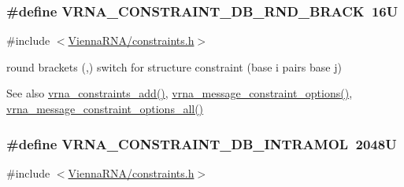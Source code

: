 \subsubsection[{V\+R\+N\+A\+\_\+\+C\+O\+N\+S\+T\+R\+A\+I\+N\+T\+\_\+\+D\+B\+\_\+\+R\+N\+D\+\_\+\+B\+R\+A\+C\+K}]{\setlength{\rightskip}{0pt plus 5cm}\#define V\+R\+N\+A\+\_\+\+C\+O\+N\+S\+T\+R\+A\+I\+N\+T\+\_\+\+D\+B\+\_\+\+R\+N\+D\+\_\+\+B\+R\+A\+C\+K~16\+U}\label{group__constraints_gac17b034852c914bc5879954c65d7e74b}


{\ttfamily \#include $<$\hyperlink{constraints_8h}{Vienna\+R\+N\+A/constraints.\+h}$>$}



round brackets \textquotesingle{}(\textquotesingle{},\textquotesingle{})\textquotesingle{} switch for structure constraint (base i pairs base j) 

\begin{DoxySeeAlso}{See also}
\hyperlink{group__constraints_ga35a401f680969a556858a8dd5f1d07cc}{vrna\+\_\+constraints\+\_\+add()}, \hyperlink{group__constraints_gaa1f20b53bf09ac2e6b0dbb13f7d89670}{vrna\+\_\+message\+\_\+constraint\+\_\+options()}, \hyperlink{group__constraints_gaec7e13fa0465c2acc7a621d1aecb709f}{vrna\+\_\+message\+\_\+constraint\+\_\+options\+\_\+all()} 
\end{DoxySeeAlso}
\hypertarget{group__constraints_ga5c17253f5a39d1d49b0fb11f5196982a}{}
\subsubsection[{V\+R\+N\+A\+\_\+\+C\+O\+N\+S\+T\+R\+A\+I\+N\+T\+\_\+\+D\+B\+\_\+\+I\+N\+T\+R\+A\+M\+O\+L}]{\setlength{\rightskip}{0pt plus 5cm}\#define V\+R\+N\+A\+\_\+\+C\+O\+N\+S\+T\+R\+A\+I\+N\+T\+\_\+\+D\+B\+\_\+\+I\+N\+T\+R\+A\+M\+O\+L~2048\+U}\label{group__constraints_ga5c17253f5a39d1d49b0fb11f5196982a}


{\ttfamily \#include $<$\hyperlink{constraints_8h}{Vienna\+R\+N\+A/constraints.\+h}$>$}



